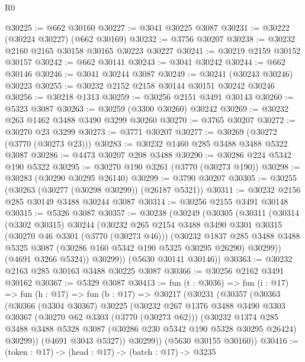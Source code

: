\begin{lexlean}{R0}
\begin{coremodule}
@30225 := @662 @30160
@30227 := @3041 @30225 @3087
@30231 := @30222 (@30224 @30227) (@662 @30169)
@30232 := @3756 @30207
@30238 := @30232 @2160 @2165 @30158 @30165 @30223 @30227
@30241 := @30219 @2159 @30152 @30157
@30242 := @662 @30141
@30243 := @3041 @30242
@30244 := @662 @30146
@30246 := @3041 @30244 @3087
@30249 := @30241 (@30243 @30246) @30223
@30255 := @30232 @2152 @2158 @30144 @30151 @30242 @30246
@30256 := @30218 @1313
@30259 := @30256 @2151 @3491 @30143
@30260 := @5323 @3087
@30263 := @30259 (@3300 @30260) @30242
@30269 := @30232 @263 @1462 @3488 @3490 @3299 @30260
@30270 := @3765 @30207
@30272 := @30270 @23 @3299
@30273 := @3771 @30207
@30277 := @30269 (@30272 (@3770 (@30273 @23)))
@30283 := @30232 @1460 @285 @3488 @3488 @5322 @3087
@30286 := @4473 @30207 @208 @3488
@30290 := @30286 @224 @5342 @190 @5322
@30295 := @30270 @190 @3261 (@3770 (@30273 @190))
@30298 := @30283 (@30290 @30295 @26140)
@30299 := @3790 @30207
@30305 := @30255 (@30263 (@30277 (@30298 @30299)) (@26187 @5321))
@30311 := @30232 @2156 @285 @30149 @3488 @30244 @3087
@30314 := @30256 @2155 @3491 @30148
@30315 := @5326 @3087
@30357 := @30238
    (@30249
      (@30305
        (@30311
          (@30314
            (@3302 @30315)
            @30244
            (@30232
              @265
              @2154
              @3488
              @3490
              @3301
              @30315
              (@30270 @46 @3301 (@3770 (@30273 @46)))
              (@30232
                @1837
                @285
                @3488
                @3488
                @5325
                @3087
                (@30286 @160 @5342 @190 @5325 @30295 @26290)
                @30299))
            (@4691 @3266 @5324))
          @30299))
      (@5630 @30141 @30146))
@30363 := @30232 @2163 @285 @30163 @3488 @30225 @3087
@30366 := @30256 @2162 @3491 @30162
@30367 := @5329 @3087
@30413 := fun (t : @3036) =>
  fun (i : @17) =>
  fun (h : @17) =>
  fun (b : @17) =>
  @30217
    (@30231
      (@30357
        (@30363
          (@30366
            (@3304 @30367)
            @30225
            (@30232
              @267
              @1376
              @3488
              @3490
              @3303
              @30367
              (@30270 @62 @3303 (@3770 (@30273 @62)))
              (@30232
                @1374
                @285
                @3488
                @3488
                @5328
                @3087
                (@30286 @230 @5342 @190 @5328 @30295 @26424)
                @30299))
            (@4691 @3043 @5327))
          @30299))
      (@5630 @30155 @30160))
@30416 := (token : @17) -> (head : @17) -> (batch : @17) -> @3235

\end{coremodule}
\end{lexlean}
